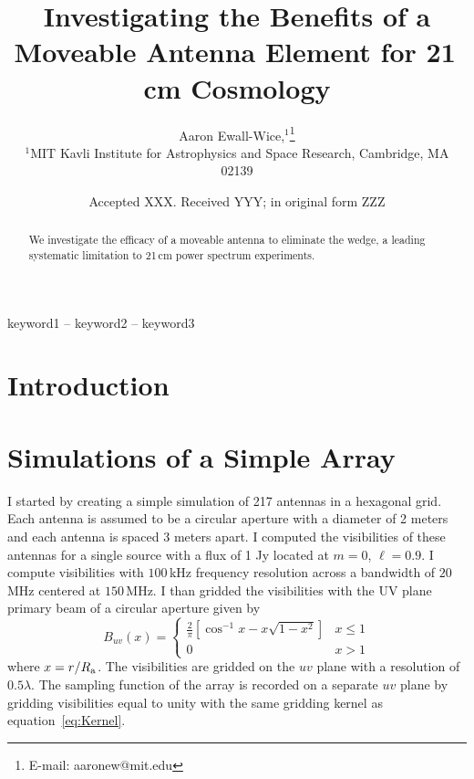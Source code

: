 \documentclass[a4paper,fleqn,usenatbib]{mnras}
\title[Moveable Antenna]{Investigating the Benefits of a Moveable Antenna Element for 21\,cm Cosmology}
\author[Ewall-Wice et al.]{
Aaron Ewall-Wice,$^{1}$\thanks{E-mail: aaronew@mit.edu}
\\
$^{1}$MIT Kavli Institute for Astrophysics and Space Research, Cambridge, MA 02139\\
}
\date{Accepted XXX. Received YYY; in original form ZZZ}
\begin{document}
\label{firstpage}
\pagerange{\pageref{firstpage}--\pageref{lastpage}}
\maketitle

\begin{abstract}
We investigate the efficacy of a moveable antenna to eliminate the wedge, a leading systematic limitation to 21\,cm power spectrum experiments. 
\end{abstract}

\begin{keywords}
keyword1 -- keyword2 -- keyword3
\end{keywords}



\section{Introduction}



\section{Simulations of a Simple Array}

I started by creating a simple simulation of 217 antennas in a hexagonal grid. Each antenna is assumed to be a circular aperture with a diameter of 2 meters and each antenna is spaced 3 meters apart. I computed the visibilities of these antennas for a single source with a flux of 1 Jy located at $m=0$, $\ell=0.9$. I compute visibilities with $100$\,kHz frequency resolution across a bandwidth of $20$\,MHz centered at $150$\,MHz. I than gridded the visibilities with the UV plane primary beam of a circular aperture given by \citep{Vedantham:2015a}
\begin{equation}\label{eq:Kernel}
B_{uv}(x)=\begin{cases} \frac{2}{\pi} \left[\cos^{-1}x-x \sqrt{1-x^2} \right] & x\leq1 \\ 0 & x>1 \end{cases}
\end{equation}
where $x=r/R_\text{a}$. The visibilities are gridded on the $uv$ plane with a resolution of $0.5\lambda$. The sampling function of the array is recorded on a separate $uv$ plane by gridding visibilities equal to unity with the same gridding kernel as equation~\ref{eq:Kernel}. 
\end{document}
